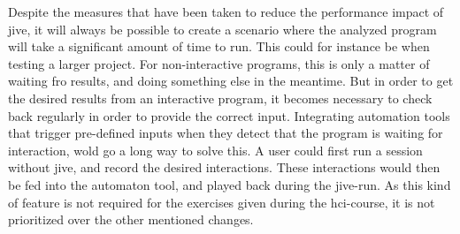 Despite the measures that have been taken to reduce the performance impact of \gls{jive}, it will always be possible to create a scenario where the analyzed program will take a significant amount of time to run.
This could for instance be when testing a larger project.
For non-interactive programs, this is only a matter of waiting fro results, and doing something else in the meantime.
But in order to get the desired results from an interactive program, it becomes necessary to check back regularly in order to provide the correct input.
Integrating automation tools that trigger pre-defined inputs when they detect that the program is waiting for interaction, wold go a long way to solve this.
A user could first run a session without \gls{jive}, and record the desired interactions.
These interactions would then be fed into the automaton tool, and played back during the \gls{jive}-run.
As this kind of feature is not required for the exercises given during the \gls{hci}-course, it is not prioritized over the other mentioned changes.




